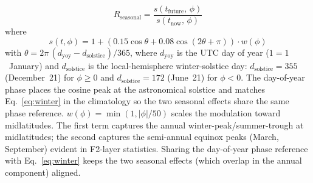 \documentclass[11pt,a4paper]{article}
\begin{document}
\begin{equation}
  R_{\text{seasonal}} = \frac{s(t_{\text{future}},\,\phi)}{s(t_{\text{now}},\,\phi)}
\end{equation}
where
\begin{equation}\label{eq:seasonal}
  s(t,\phi) = 1 + (0.15\cos\theta + 0.08\cos(2\theta + \pi))
              \cdot w(\phi)
\end{equation}
with $\theta = 2\pi\,(d_{\text{yoy}} - d_{\text{solstice}})/365$,
where $d_{\text{yoy}}$ is the UTC day of year ($1 = 1$~January) and
$d_{\text{solstice}}$ is the local-hemisphere winter-solstice day:
$d_{\text{solstice}} = 355$ (December~21) for $\phi \geq 0$ and
$d_{\text{solstice}} = 172$ (June~21) for $\phi < 0$.  The
day-of-year phase places the cosine peak at the astronomical
solstice and matches Eq.~\ref{eq:winter} in the climatology so
the two seasonal effects share the same phase reference.
$w(\phi) = \min(1, |\phi|/50)$ scales the modulation toward
midlatitudes.  The first term captures the annual
winter-peak/summer-trough at midlatitudes; the second captures
the semi-annual equinox peaks (March, September) evident in
F2-layer statistics.  Sharing the day-of-year phase reference
with Eq.~\ref{eq:winter} keeps the two seasonal effects (which
overlap in the annual component) aligned.
\end{document}
